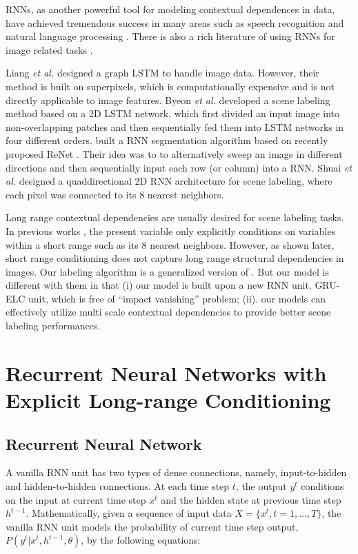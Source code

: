 \documentclass[10pt,twocolumn,letterpaper]{article}
\begin{document}
RNNs, as another powerful tool for modeling contextual dependences in data, have achieved tremendous success in many areas such as speech recognition \cite{11} and natural language processing \cite{12}. There is also a rich literature of using RNNs for image related tasks \cite{17,18, 19, 20, 21}. 

Liang \textit{et al.} \cite{27} designed a graph LSTM to handle image data. However, their method is built on superpixels, which is computationally expensive and is not directly applicable to image features. Byeon \textit{et al.} \cite{10} developed a scene labeling method based on a 2D LSTM network, which first divided an input image into non-overlapping patches and then sequentially fed them into LSTM networks in four different orders. \cite{13} built a RNN segmentation algorithm based on recently proposed ReNet \cite{14}. Their idea was to to alternatively sweep an image in different directions and then sequentially input each row (or column) into a RNN. Shuai \textit{et al.} \cite{15,16} designed a quaddirectional 2D RNN architecture for scene labeling, where each pixel was connected to its 8 nearest neighbors. 



Long range contextual dependencies are usually desired for scene labeling tasks. In previous works \cite{23, 16, 14, 24, 25, 26, 28}, the present variable only explicitly conditions on variables within a short range such as its 8 nearest neighbors. However, as shown later, short range conditioning does not capture long range structural dependencies in images. Our labeling algorithm is a generalized version of \cite{13,15,16}. But our model is different with them in that (i) our model is built upon a new RNN unit, GRU-ELC unit, which is free of ``impact vanishing'' problem; (ii). our models can effectively utilize multi scale contextual dependencies to provide better scene labeling performances.


\section{Recurrent Neural Networks with Explicit Long-range Conditioning}
\subsection{Recurrent Neural Network}
A vanilla RNN unit has two types of dense connections, namely, input-to-hidden and hidden-to-hidden connections. At each time step $t$, the output $y^{t}$ conditions on the input at current time step $x^{t}$ and the hidden state at previous time step $h^{t-1}$. Mathematically, given a sequence of input data $X=\{x^{t}, t=1,...,T\}$, the vanilla RNN unit models the probability of current time step output, $P( y^t | x^t, h^{t-1}, \theta)$, by the following equations:
\end{document}
